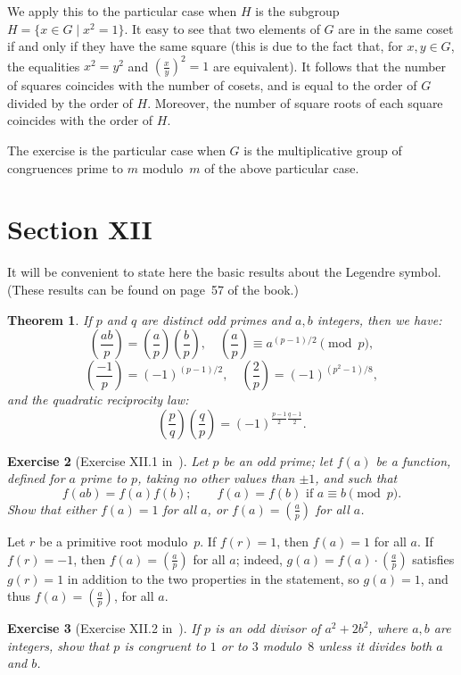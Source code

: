 \documentclass[12pt,letterpaper]{article}
\newtheorem{thm}{Theorem}%
\newtheorem{exer}[thm]{Exercise}
\theoremstyle{definition}
\begin{document}
We apply this to the particular case when $H$ is the subgroup $H=\{x\in G\mid x^2=1\}$. It easy to see that two elements of $G$ are in the same coset if and only if they have the same square (this is due to the fact that, for $x,y\in G$, the equalities $x^2=y^2$ and $(\frac{x}{y})^2=1$ are equivalent). It follows that the number of squares coincides with the number of cosets, and is equal to the order of $G$ divided by the order of $H$. Moreover, the number of square roots of each square coincides with the order of $H$. 

The exercise is the particular case when $G$ is the multiplicative group of congruences prime to $m$ modulo~$m$ of the above particular case. 

\section{Section XII} %

It will be convenient to state here the basic results about the Legendre symbol. (These results can be found on page~57 of the book.) 

\begin{thm}\label{Tleg}
If $p$ and $q$ are distinct odd primes and $a,b$ integers, then we have: 
$$
\left(\frac{ab}{p}\right)=\left(\frac{a}{p}\right)\left(\frac{b}{p}\right),\quad \left(\frac{a}{p}\right)\equiv a^{(p-1)/2}\pmod{p},
$$ 
$$
\left(\frac{-1}{p}\right)=(-1)^{(p-1)/2},\quad \left(\frac{2}{p}\right)=(-1)^{(p^2-1)/8},
$$ 
and the \emph{quadratic reciprocity law}:
$$
\left(\frac{p}{q}\right)\left(\frac{q}{p}\right)=(-1)^{\frac{p-1}{2}\frac{q-1}{2}}.
$$ 
\end{thm}

\begin{exer}[Exercise XII.1 in~\cite{weil1979}]
Let $p$ be an odd prime; let $f(a)$ be a function, defined for $a$ prime to $p$, taking no other values than $\pm 1$, and such that
\[
f(ab)=f(a)f(b); \qquad f(a)=f(b) \text{ if } a\equiv b\pmod p.
\]
Show that either $f(a)=1$ for all $a$, or $f(a)=(\frac{a}{p})$ for all $a$.
\end{exer}

Let $r$ be a primitive root modulo~$p$. If $f(r)=1$, then $f(a)=1$ for all $a$. If $f(r)=-1$, then $f(a)=(\frac{a}{p})$ for all $a$; indeed, $g(a)=f(a)\cdot(\frac{a}{p})$ satisfies $g(r)=1$ in addition to the two properties in the statement, so $g(a)=1$, and thus $f(a)=(\frac{a}{p})$, for all $a$. 

\begin{exer}[Exercise XII.2 in~\cite{weil1979}]
If $p$ is an odd divisor of $a^2+2b^2$, where $a,b$ are integers, show that $p$ is congruent to $1$ or to $3$ modulo~$8$ unless it divides both $a$ and $b$.
\end{exer}
\end{document}
